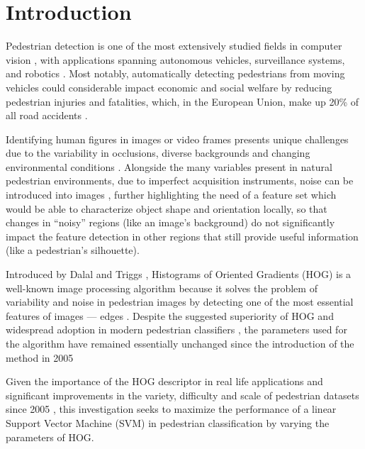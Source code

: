 \section{Introduction}\label{sec:introduction}
Pedestrian detection is one of the most extensively studied fields in computer vision \cite{dollar_2012_pedestrian}, with applications spanning autonomous vehicles, surveillance systems, and robotics \cite{dollar_2012_pedestrian}. Most notably, automatically detecting pedestrians from moving vehicles could considerable impact economic and social welfare by reducing pedestrian injuries and fatalities, which, in the European Union, make up 20\% of all road accidents \cite{slootmans_2021_european}.

Identifying human figures in images or video frames presents unique challenges due to the variability in occlusions, diverse backgrounds and changing environmental conditions \cite{dollar_2012_pedestrian}. Alongside the many variables present in natural pedestrian environments, due to imperfect acquisition instruments, noise can be introduced into images \cite{faraji_2006_ccd}, further highlighting the need of a feature set which would be able to characterize object shape and orientation locally, so that changes in “noisy” regions (like an image’s background) do not significantly impact the feature detection in other regions that still provide useful information (like a pedestrian’s silhouette).

Introduced by Dalal and Triggs \cite{dalal_2005_histograms}, Histograms of Oriented Gradients (HOG) is a well-known \cite{dollar_2012_pedestrian} image processing algorithm because it solves the problem of variability and noise in pedestrian images by detecting one of the most essential features of images — edges \cite{niebles2012edge} \cite{dalal_2005_histograms}. Despite the suggested superiority of HOG \cite{dalal_2005_histograms} and widespread adoption in modern pedestrian classifiers \cite{dollar_2012_pedestrian}, the parameters used for the algorithm have remained essentially unchanged since the introduction of the method in 2005 \cite{dalal_2005_histograms}

Given the importance of the HOG descriptor in real life applications and significant improvements in the variety, difficulty and scale of pedestrian datasets since 2005 \cite{dollar_2012_pedestrian}, this investigation seeks to maximize the performance of a linear Support Vector Machine (SVM) in pedestrian classification by varying the parameters of HOG.